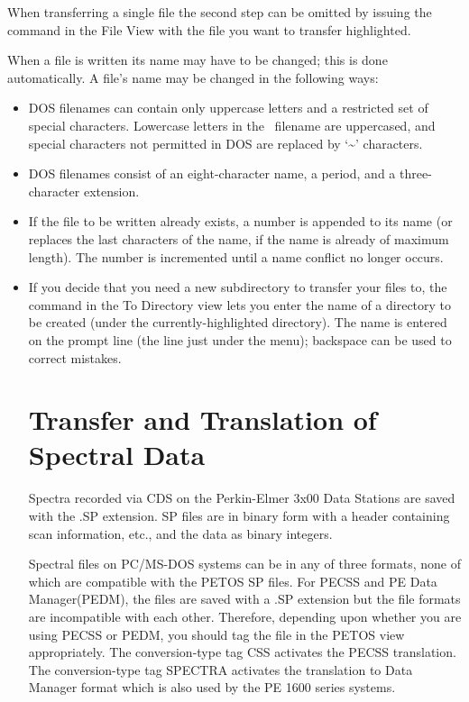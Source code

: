 \noindent
When transferring a single file the second step can be omitted by
issuing the  command in the File View with the
file you want to transfer highlighted.


When a file is written its name may have to be changed; this is done
automatically.  A file's name may be changed in the following ways:
\begin{itemize}
\item
DOS filenames can contain only uppercase letters and a restricted set
of special characters.  Lowercase letters in the \OS\ filename are
uppercased, and special characters not permitted in DOS are replaced
by `\~{ }' characters.
\item
DOS filenames consist of an eight-character name, a period, and a
three-character extension.
\item
If the file to be written already exists, a number is appended to its
name (or replaces the last characters of the name, if the name is
already of maximum length).  The number is incremented until a name
conflict no longer occurs.
\item
If you decide that you need a new subdirectory to transfer your files
to, the  command in the To Directory view lets you enter
the name of a directory to be created (under the currently-highlighted
directory).  The name is entered on the prompt line (the line just under
the menu); backspace can be used to correct mistakes.


\section{Transfer and Translation of Spectral Data}

Spectra recorded via CDS on the Perkin-Elmer 3x00 Data Stations are
saved with the .SP extension.  SP files are in binary form with a
header containing scan information, etc., and the data as binary
integers.

Spectral files on PC/MS-DOS systems can be in any of three formats,
none of which are compatible with the PETOS SP files.  For PECSS and
PE Data Manager(PEDM), the files are saved with a .SP extension but
the file formats are incompatible with each other.  Therefore,
depending upon whether you are using PECSS or PEDM, you should tag the
file in the PETOS view appropriately.  The conversion-type tag CSS
activates the PECSS translation.  The conversion-type tag SPECTRA
activates the translation to Data Manager format which is also used by
the PE 1600 series systems.


\end{itemize}
